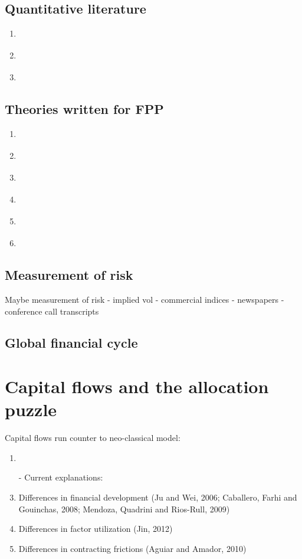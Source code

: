 \documentclass{ar-1col}
\begin{document}
\subsection{Quantitative literature}
\begin{enumerate}
\item \citet{ColacitoCroce2011}
\item \citet{GourioSiemerVerdelhan2011}
\item \citet{ColacitoCroceHoHoward2018}
\end{enumerate}
\subsection{Theories written for FPP}
\begin{enumerate}
    \item \citet{Heyerdahl-Larsen2011}
    \item \citet{Stathopoulos2017}
    \item \citet{Verdelhan2010}
    \item \citet{Backusetal2001}
    \item \citet{BansalShaliastovich2010}
    \item \citet{GabaixMaggiori2015}
\end{enumerate}

\subsection{Measurement of risk}
Maybe measurement of risk - implied vol - commercial indices -
newspapers - conference call transcripts

\subsection{Global financial cycle}

\section{Capital flows and the allocation puzzle}
Capital flows run counter to neo-classical model:
\begin{enumerate}
\item \citet{GourinchasJeanne2013}
\item[-] Current explanations:
\item Differences in financial development (Ju and Wei, 2006;
  Caballero, Farhi and Gouinchas, 2008; Mendoza, Quadrini and
  Rios-Rull, 2009)
\item Differences in factor utilization (Jin, 2012)
\item Differences in contracting frictions (Aguiar and Amador, 2010)
\end{enumerate}
\end{document}
